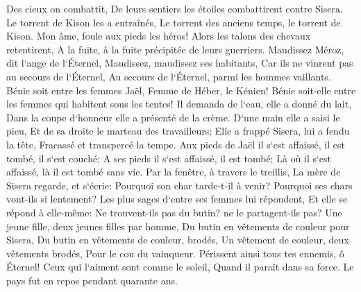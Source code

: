 \verse Des cieux on combattit, De leurs sentiers les étoiles combattirent contre Sisera. 
\verse Le torrent de Kison les a entraînés, Le torrent des anciens temps, le torrent de Kison. Mon âme, foule aux pieds les héros! 
\verse Alors les talons des chevaux retentirent, A la fuite, à la fuite précipitée de leurs guerriers. 
\verse Maudissez Méroz, dit l`ange de l`Éternel, Maudissez, maudissez ses habitants, Car ils ne vinrent pas au secours de l`Éternel, Au secours de l`Éternel, parmi les hommes vaillants. 
\verse Bénie soit entre les femmes Jaël, Femme de Héber, le Kénien! Bénie soit-elle entre les femmes qui habitent sous les tentes! 
\verse Il demanda de l`eau, elle a donné du lait, Dans la coupe d`honneur elle a présenté de la crème. 
\verse D`une main elle a saisi le pieu, Et de sa droite le marteau des travailleurs; Elle a frappé Sisera, lui a fendu la tête, Fracassé et transpercé la tempe. 
\verse Aux pieds de Jaël il s`est affaissé, il est tombé, il s`est couché; A ses pieds il s`est affaissé, il est tombé; Là où il s`est affaissé, là il est tombé sans vie. 
\verse Par la fenêtre, à travers le treillis, La mère de Sisera regarde, et s`écrie: Pourquoi son char tarde-t-il à venir? Pourquoi ses chars vont-ils si lentement? 
\verse Les plus sages d`entre ses femmes lui répondent, Et elle se répond à elle-même: 
\verse Ne trouvent-ils pas du butin? ne le partagent-ils pas? Une jeune fille, deux jeunes filles par homme, Du butin en vêtements de couleur pour Sisera, Du butin en vêtements de couleur, brodés, Un vêtement de couleur, deux vêtements brodés, Pour le cou du vainqueur. 
\verse Périssent ainsi tous tes ennemis, ô Éternel! Ceux qui l`aiment sont comme le soleil, Quand il paraît dans sa force. Le pays fut en repos pendant quarante ans. 

\chapter{}

